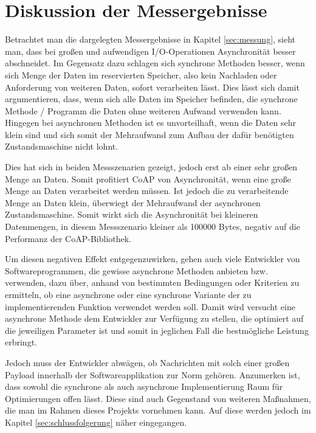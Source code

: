 \section{Diskussion der Messergebnisse}
\label{sec:diskussion-der-messergebnisse}

Betrachtet man die dargelegten Messergebnisse in Kapitel \ref{sec:messung}, sieht man, dass bei großen und aufwendigen I/O-Operationen Asynchronität besser abschneidet. Im Gegensatz dazu schlagen sich synchrone Methoden besser, wenn sich Menge der Daten im reservierten Speicher, also kein Nachladen oder Anforderung von weiteren Daten, sofort verarbeiten lässt. Dies lässt sich damit argumentieren, dass, wenn sich alle Daten im Speicher befinden, die synchrone Methode / Programm die Daten ohne weiteren Aufwand verwenden kann. Hingegen bei asynchronen Methoden ist es unvorteilhaft, wenn die Daten sehr klein sind und sich somit der Mehraufwand zum Aufbau der dafür benötigten Zustandsmaschine nicht lohnt.

Dies hat sich in beiden Messszenarien gezeigt, jedoch erst ab einer sehr großen Menge an Daten. Somit profitiert CoAP von Asynchronität, wenn eine große Menge an Daten verarbeitet werden müssen. Ist jedoch die zu verarbeitende Menge an Daten klein, überwiegt der Mehraufwand der asynchronen Zustandsmaschine. Somit wirkt sich die Asynchronität bei kleineren Datenmengen, in diesem Messszenario kleiner als 100000 Bytes, negativ auf die Performanz der CoAP-Bibliothek.

Um diesen negativen Effekt entgegenzuwirken, gehen auch viele Entwickler von Softwareprogrammen, die gewisse asynchrone Methoden anbieten bzw. verwenden, dazu über, anhand von bestimmten Bedingungen oder Kriterien zu ermitteln, ob eine asynchrone oder eine synchrone Variante der zu implementierenden Funktion verwendet werden soll. Damit wird versucht eine asynchrone Methode dem Entwickler zur Verfügung zu stellen, die optimiert auf die jeweiligen Parameter ist und somit in jeglichen Fall die bestmögliche Leistung erbringt.

Jedoch muss der Entwickler abwägen, ob Nachrichten mit solch einer großen Payload innerhalb der Softwareapplikation zur Norm gehören. Anzumerken ist, dass sowohl die synchrone als auch asynchrone Implementierung Raum für Optimierungen offen lässt. Diese sind auch Gegenstand von weiteren Maßnahmen, die man im Rahmen dieses Projekts vornehmen kann. Auf diese werden jedoch im Kapitel \ref{sec:schlussfolgerung} näher eingegangen.